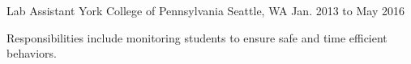 \begin{cventries}
  \cventry
    {Lab Assistant} %
    {York College of Pennsylvania} %
    {Seattle, WA} %
    {Jan. 2013 to May 2016} %
    {
      \begin{cvitems} %
        \item {Responsibilities include monitoring students to ensure safe and time efficient behaviors.}
      \end{cvitems}
    }


\end{cventries}
